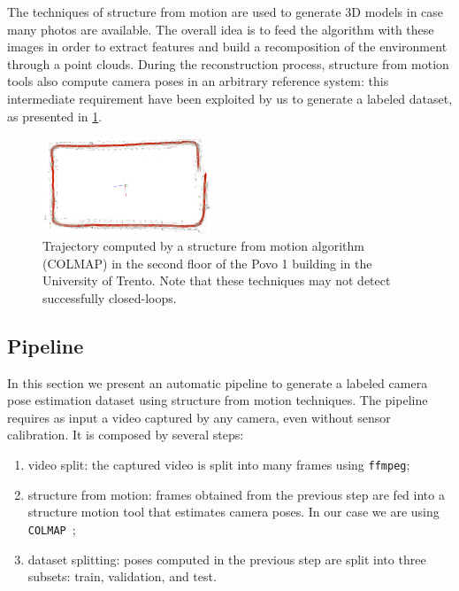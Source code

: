 The techniques of structure from motion are used to generate 3D models in case many photos are available. The overall idea is to feed the algorithm with these images in order to extract features and build a recomposition of the environment through a point clouds.
During the reconstruction process, structure from motion tools also compute camera poses in an arbitrary reference system: this intermediate requirement have been exploited by us to generate a labeled dataset, as presented in \cref{fig:trajectory-colmap}.

\begin{figure}[htbp]
    \begin{center}
        \includegraphics[width=0.45\textwidth]{./imgs/trajectory_colmap.png}
    \end{center}
    \caption{Trajectory computed by a structure from motion algorithm (COLMAP) in the second floor of the Povo 1 building in the University of Trento. Note that these techniques may not detect successfully closed-loops.}
    \label{fig:trajectory-colmap}
\end{figure}

\subsection{Pipeline}
In this section we present an automatic pipeline to generate a labeled camera pose estimation dataset using structure from motion techniques. The pipeline requires as input a video captured by any camera, even without sensor calibration. It is composed by several steps:
\begin{enumerate}
    \item video split: the captured video is split into many frames using \texttt{ffmpeg};
    \item structure from motion: frames obtained from the previous step are fed into a structure motion tool that estimates camera poses. In our case we are using \texttt{COLMAP}~\cite{colmap};
    \item dataset splitting: poses computed in the previous step are split into three subsets: train, validation, and test.
\end{enumerate}

